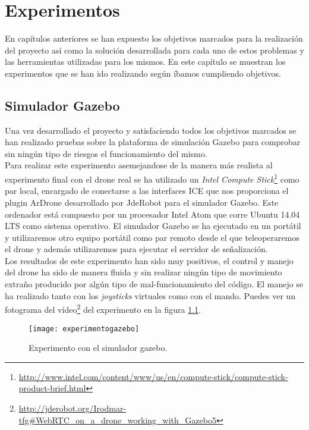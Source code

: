 \chapter{Experimentos}

En capítulos anteriores se han expuesto los objetivos marcados para la realización del proyecto así como la solución desarrollada para cada uno de estos problemas y las herramientas utilizadas para los mismos. En este capítulo se muestran los experimentos que se han ido realizando según íbamos cumpliendo objetivos.\\

\section{Simulador Gazebo}

Una vez desarrollado el proyecto y satisfaciendo todos los objetivos marcados se han realizado pruebas sobre la plataforma de simulación Gazebo para comprobar sin ningún tipo de riesgos el funcionamiento del mismo.\\

Para realizar este experimento asemejandose de la manera más realista al experimento final con el drone real se ha utilizado un \emph{Intel Compute Stick}\footnote{\url{http://www.intel.com/content/www/us/en/compute-stick/compute-stick-product-brief.html}} como par local, encargado de conectarse a las interfaces ICE que nos proporciona el plugin ArDrone desarrollado por JdeRobot para el simulador Gazebo. Este ordenador está compuesto por un procesador Intel Atom que corre Ubuntu 14.04 LTS como sistema operativo. El simulador Gazebo se ha ejecutado en un portátil y utilizaremos otro equipo portátil como par remoto desde el que teleoperaremos el drone y además utilizaremos para ejecutar el servidor de señalización.\\

Los resultados de este experimento han sido muy positivos, el control y manejo del drone ha sido de manera fluida y sin realizar ningún tipo de movimiento extraño producido por algún tipo de mal-funcionamiento del código. El manejo se ha realizado tanto con los \emph{joysticks} virtuales como con el mando. Puedes ver un fotograma del vídeo\footnote{\url{http://jderobot.org/Irodmar-tfg#WebRTC_on_a_drone_working_with_Gazebo5}} del experimento en la figura \ref{fig:experimentogazebo}.\\

\begin{figure}[h!]
\centering
\texttt{[image: experimentogazebo]}
\caption{Experimento con el simulador gazebo.}
\label{fig:experimentogazebo}
\end{figure}

